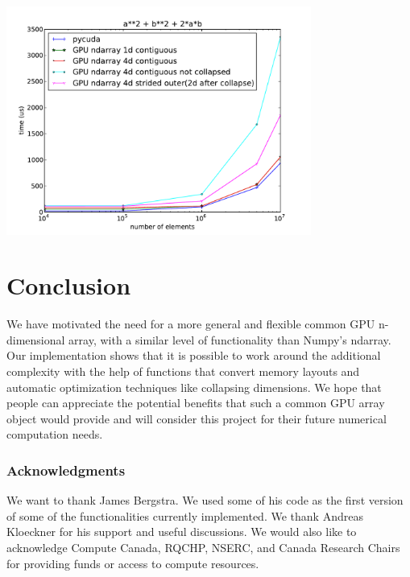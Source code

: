 \documentclass{article} %
\begin{document}
\includegraphics[width=0.75\textwidth]{a2pb2p2ab_no_alloc}


\section{Conclusion}

We have motivated the need for a more general and flexible common GPU n-dimensional array, with a similar level of functionality than Numpy's ndarray.
Our implementation shows that it is possible to work around the additional complexity with the help of functions that convert memory layouts and automatic optimization techniques like collapsing dimensions.
We hope that people can appreciate the potential benefits that such a common GPU array object would provide and will consider this project for their future numerical computation needs.

\subsubsection*{Acknowledgments}

We want to thank James Bergstra. We used some of his code as the first version of some of the functionalities currently implemented. We thank Andreas Kloeckner for his support and useful discussions. We would also like to acknowledge Compute Canada, RQCHP, NSERC, and Canada Research Chairs for providing funds or access to compute resources.




\end{document}
